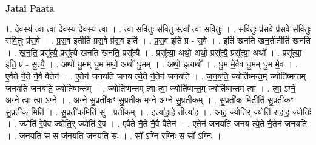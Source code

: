 \documentclass[17pt]{extarticle}
\begin{document}
\textbf{Jatai Paata} \newline

1. दे॒वस्य॑ त्वा त्वा दे॒वस्य॑ दे॒वस्य॑ त्वा । . त्वा॒ स॒वि॒तुः स॑वि॒तु स्त्वा᳚ त्वा सवि॒तुः । . स॒वि॒तुः प्र॑स॒वे प्र॑स॒वे स॑वि॒तुः स॑वि॒तुः प्र॑स॒वे । . प्र॒स॒व इतीति॑ प्रस॒वे प्र॑स॒व इति॑ । . प्र॒स॒व इति॑ प्र - स॒वे । . इति॑ खनति खन॒तीतीति॑ खनति । . ख॒न॒ति॒ प्रसू᳚त्यै॒ प्रसू᳚त्यै खनति खनति॒ प्रसू᳚त्यै । . प्रसू᳚त्या॒ अथो॒ अथो॒ प्रसू᳚त्यै॒ प्रसू᳚त्या॒ अथो᳚ । . प्रसू᳚त्या॒ इति॒ प्र - सू॒त्यै॒ । . अथो॑ धू॒मम् धू॒म मथो॒ अथो॑ धू॒मम् । . अथो॒ इत्यथो᳚ । . धू॒म मे॒वैव धू॒मम् धू॒म मे॒व । . ए॒वैते नै॒ते नै॒वै वैतेन॑ । . ए॒तेन॑ जनयति जनय त्ये॒ते नै॒तेन॑ जनयति । . ज॒न॒य॒ति॒ ज्योति॑ष्मन्त॒म् ज्योति॑ष्मन्तम् जनयति जनयति॒ ज्योति॑ष्मन्तम् । . ज्योति॑ष्मन्तम् त्वा त्वा॒ ज्योति॑ष्मन्त॒म् ज्योति॑ष्मन्तम् त्वा । . त्वा॒ ऽग्ने॒ अ॒ग्ने॒ त्वा॒ त्वा॒ ऽग्ने॒ । . अ॒ग्ने॒ सु॒प्रती॑कꣳ सु॒प्रती॑क मग्ने अग्ने सु॒प्रती॑कम् । . सु॒प्रती॑क॒ मितीति॑ सु॒प्रती॑कꣳ सु॒प्रती॑क॒ मिति॑ । . सु॒प्रती॑क॒मिति॑ सु - प्रती॑कम् । . इत्या॑हा॒हे तीत्या॑ह । . आ॒ह॒ ज्योति॒र् ज्योति॑ राहाह॒ ज्योतिः॑ । . ज्योति॑ रे॒वैव ज्योति॒र् ज्योति॑ रे॒व । . ए॒वैते नै॒ते नै॒वै वैतेन॑ । . ए॒तेन॑ जनयति जनय त्ये॒ते नै॒तेन॑ जनयति । . ज॒न॒य॒ति॒ स स ज॑नयति जनयति॒ सः । . सो᳚ ऽग्नि र॒ग्निः स सो᳚ ऽग्निः । \newline
\end{document}

